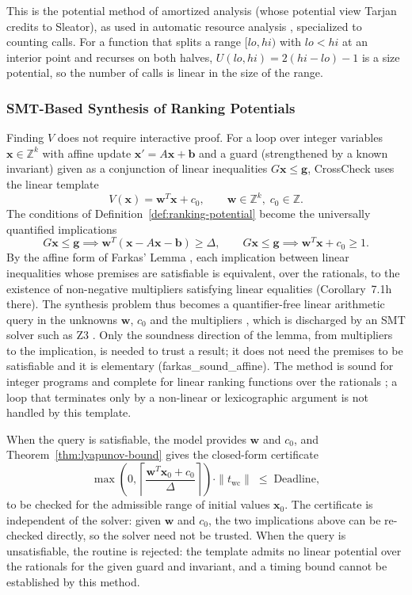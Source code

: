 \documentclass[oneside,english]{amsart}
\numberwithin{equation}{section}
\numberwithin{figure}{section}
\theoremstyle{plain}
\theoremstyle{definition}
\theoremstyle{plain}
\theoremstyle{remark}
\theoremstyle{plain}
\theoremstyle{definition}
\theoremstyle{plain}
\theoremstyle{remark}
\newcommand{\lean}[1]{{\ttfamily\small #1}}
\begin{document}
This is the potential method of amortized analysis \cite{tarjan1985complexity} (whose potential view Tarjan credits to Sleator), as used in automatic resource analysis \cite{hoffmann2012multivariate}, specialized to counting calls. For a function that splits a range $[lo, hi)$ with $lo < hi$ at an interior point and recurses on both halves, $U(lo, hi) = 2(hi - lo) - 1$ is a size potential, so the number of calls is linear in the size of the range.

\subsubsection{SMT-Based Synthesis of Ranking Potentials}
\label{subsubsec:smt-synthesis}

Finding $V$ does not require interactive proof. For a loop over integer variables $\mathbf{x} \in \mathbb{Z}^k$ with affine update $\mathbf{x}' = A\mathbf{x} + \mathbf{b}$ and a guard (strengthened by a known invariant) given as a conjunction of linear inequalities $G\mathbf{x} \le \mathbf{g}$, CrossCheck uses the linear template
\[
V(\mathbf{x}) = \mathbf{w}^T \mathbf{x} + c_0, \qquad \mathbf{w} \in \mathbb{Z}^k, \; c_0 \in \mathbb{Z}.
\]
The conditions of Definition~\ref{def:ranking-potential} become the universally quantified implications
\[
G\mathbf{x} \le \mathbf{g} \implies \mathbf{w}^T (\mathbf{x} - A\mathbf{x} - \mathbf{b}) \ge \Delta, \qquad G\mathbf{x} \le \mathbf{g} \implies \mathbf{w}^T \mathbf{x} + c_0 \ge 1 .
\]
By the affine form of Farkas' Lemma \cite{schrijver1986theory}, each implication between linear inequalities whose premises are satisfiable is equivalent, over the rationals, to the existence of non-negative multipliers satisfying linear equalities (Corollary~7.1h there). The synthesis problem thus becomes a quantifier-free linear arithmetic query in the unknowns $\mathbf{w}$, $c_0$ and the multipliers \cite{colon2001synthesis,podelski2004complete}, which is discharged by an SMT solver such as Z3 \cite{demoura2008z3}. Only the soundness direction of the lemma, from multipliers to the implication, is needed to trust a result; it does not need the premises to be satisfiable and it is elementary (\lean{farkas\_\allowbreak sound\_\allowbreak affine}). The method is sound for integer programs and complete for linear ranking functions over the rationals \cite{benamram2014ranking}; a loop that terminates only by a non-linear or lexicographic argument is not handled by this template.

When the query is satisfiable, the model provides $\mathbf{w}$ and $c_0$, and Theorem~\ref{thm:lyapunov-bound} gives the closed-form certificate
\[
\max\left(0, \left\lceil \frac{\mathbf{w}^T \mathbf{x}_0 + c_0}{\Delta} \right\rceil\right) \cdot \|t_{\text{wc}}\| \;\le\; \text{Deadline},
\]
to be checked for the admissible range of initial values $\mathbf{x}_0$. The certificate is independent of the solver: given $\mathbf{w}$ and $c_0$, the two implications above can be re-checked directly, so the solver need not be trusted. When the query is unsatisfiable, the routine is rejected: the template admits no linear potential over the rationals for the given guard and invariant, and a timing bound cannot be established by this method.
\end{document}
